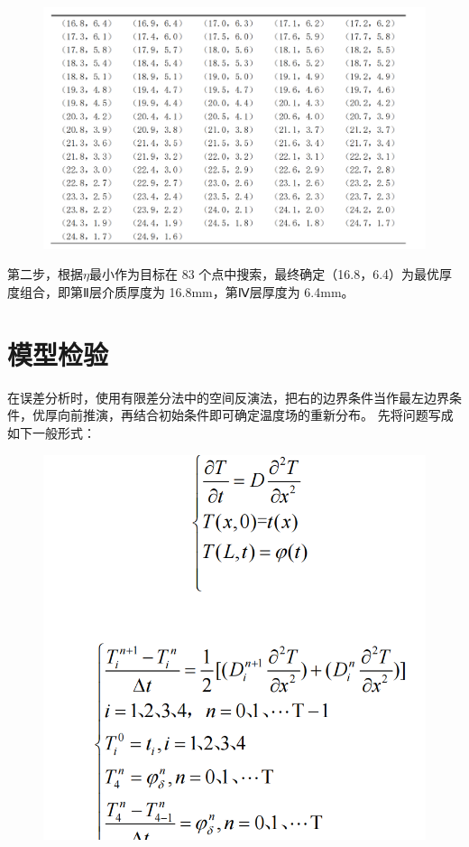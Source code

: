 \documentclass{article}
\begin{document}
	\begin{figure}[htbp]
		\centering
		\includegraphics[scale=0.4]{屏幕截图 2024-07-15 223044.png}
	\end{figure}
	
	第二步，根据$\eta $最小作为目标在 83 个点中搜索，最终确定（16.8，6.4）为最优厚
	度组合，即第Ⅱ层介质厚度为 16.8mm，第Ⅳ层厚度为 6.4mm。
	\section{模型检验}
	在误差分析时，使用有限差分法中的空间反演法，把右的边界条件当作最左边界条
	件，优厚向前推演，再结合初始条件即可确定温度场的重新分布。
	先将问题写成如下一般形式：
	
	\begin{figure}[htbp]
		\centering
		\includegraphics[scale=0.4]{屏幕截图 2024-07-15 223050.png}
	\end{figure}
	
\end{document}

